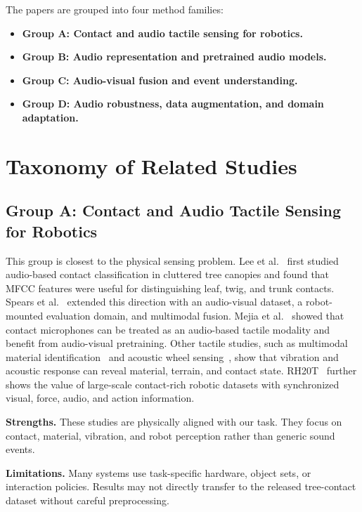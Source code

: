 \documentclass[12pt,a4paper]{article}
\begin{document}
The papers are grouped into four method families:

\begin{itemize}[leftmargin=1.5em]
\item \textbf{Group A: Contact and audio tactile sensing for robotics.}
\item \textbf{Group B: Audio representation and pretrained audio models.}
\item \textbf{Group C: Audio-visual fusion and event understanding.}
\item \textbf{Group D: Audio robustness, data augmentation, and domain adaptation.}
\end{itemize}

\section{Taxonomy of Related Studies}

\subsection{Group A: Contact and Audio Tactile Sensing for Robotics}

This group is closest to the physical sensing problem. Lee et al.~\cite{lee2022contact} first studied audio-based contact classification in cluttered tree canopies and found that MFCC features were useful for distinguishing leaf, twig, and trunk contacts. Spears et al.~\cite{spears2025tree} extended this direction with an audio-visual dataset, a robot-mounted evaluation domain, and multimodal fusion. Mejia et al.~\cite{mejia2024hearing} showed that contact microphones can be treated as an audio-based tactile modality and benefit from audio-visual pretraining. Other tactile studies, such as multimodal material identification~\cite{gomez2018material} and acoustic wheel sensing~\cite{mason2024wheel}, show that vibration and acoustic response can reveal material, terrain, and contact state. RH20T~\cite{fang2023rh20t} further shows the value of large-scale contact-rich robotic datasets with synchronized visual, force, audio, and action information.

\textbf{Strengths.} These studies are physically aligned with our task. They focus on contact, material, vibration, and robot perception rather than generic sound events.

\textbf{Limitations.} Many systems use task-specific hardware, object sets, or interaction policies. Results may not directly transfer to the released tree-contact dataset without careful preprocessing.
\end{document}

